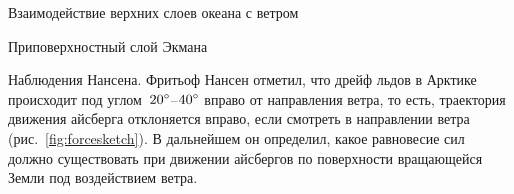 \begin{chapter}{Взаимодействие верхних слоев океана с ветром}
\begin{section}{Приповерхностный слой Экмана}

\begin{paragraph}{Наблюдения Нансена.}
Фритьоф Нансен отметил, что дрейф льдов в Арктике происходит под 
углом~${20}^\circ$--${40}^\circ$ вправо от направления ветра,
то есть, траектория движения айсберга отклоняется вправо, если смотреть
в направлении ветра (рис.~\ref{fig:forcesketch}). В дальнейшем он определил,
какое равновесие сил должно существовать при движении айсбергов
по поверхности вращающейся Земли под воздействием ветра.
%


\end{paragraph}
\end{section}
\end{chapter}
